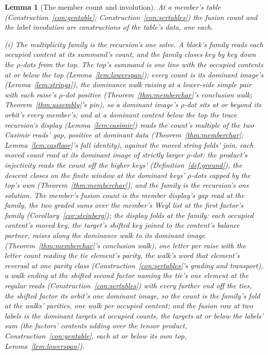 \documentclass[11pt]{article}
\newtheorem{lemma}{Lemma}
\theoremstyle{definition}
\begin{document}
\begin{lemma}[The member count and involution]\label{lem:memberdata}
At a member's table (Construction~\ref{con:gentable};
Construction~\ref{con:sertables}) the fusion count and the label
involution are constructions of the table's data, one each.

\emph{(i) The multiplicity family is the recursion's one solve.}
A block's \emph{family} reads each occupied content at its
summand's count, and the family closes key by key down the
$\rho$-dots from the top. The top's summand is one line with the
occupied contents at or below the top
(Lemma~\ref{lem:lowerspan}); every count is its dominant image's
(Lemma~\ref{lem:strings}), the dominance walk raising at a
lower-side simple pair with each raise's $\rho$-dot positive
(Theorem~\ref{thm:memberchar}'s conclusion walk;
Theorem~\ref{thm:assembly}'s pin), so a dominant image's
$\rho$-dot sits at or beyond its orbit's every member's; and at a
dominant content below the top the trace recursion's display
(Lemma~\ref{lem:casimir}) reads the count's multiple of the two
Casimir reads' gap, positive at dominant data
(Theorem~\ref{thm:memberchar}; Lemma~\ref{lem:casfloor}'s fall
identity), against the moved string folds' join, each moved count
read at its dominant image of strictly larger $\rho$-dot: the
product's injectivity reads the count off the higher keys'
(Definition~\ref{def:ground}), the descent closes on the finite
window at the dominant keys' $\rho$-dots capped by the top's own
(Theorem~\ref{thm:memberchar}), and the family is the recursion's
one solution. The member's fusion count is the member display's
gap read at the family, the two graded sums over the member's
Weyl list at the first factor's family
(Corollary~\ref{cor:steinberg}); the display folds at the family:
each occupied content's moved key, the target's shifted key
joined to the content's balance partner, raises along the
dominance walk to its dominant image
(Theorem~\ref{thm:memberchar}'s conclusion walk), one letter per
raise with the letter count reading the tie element's parity, the
walk's word that element's reversal at one parity class
(Construction~\ref{con:sertables}'s grading and transport), a
walk ending at the shifted second factor naming the tie's one
element at the regular reads (Construction~\ref{con:sertables})
with every further end off the ties, the shifted factor its
orbit's one dominant image, so the count is the family's fold at
the walks' parities, one walk per occupied content; and the
fusion row at two labels
is the dominant targets at occupied counts, the targets at or
below the labels' sum (the factors' contents adding over the
tensor product, Construction~\ref{con:gentable}, each at or below
its own top, Lemma~\ref{lem:lowerspan}).


\end{lemma}
\end{document}
